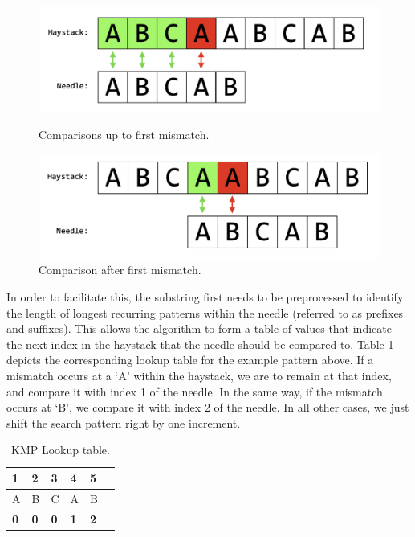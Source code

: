 \begin{figure}[H]
  \centering
  \begin{minipage}[b]{0.49\textwidth}
    \includegraphics[width=\textwidth]{images/kmp_1.png}
    \caption{Comparisons up to first mismatch.}
    \label{fig:kmp_1}
  \end{minipage}
  \hfill
  \begin{minipage}[b]{0.49\textwidth}
    \includegraphics[width=\textwidth]{images/kmp_2.png}
    \caption{Comparison after first mismatch.}
    \label{fig:kmp_2}
  \end{minipage}
\end{figure}

\noindent
In order to facilitate this, the substring first needs to be preprocessed to identify the length of longest recurring patterns within the needle (referred to as prefixes and suffixes). This allows the algorithm to form a table of values that indicate the next index in the haystack that the needle should be compared to. Table \ref{tab:kmp_table} depicts the corresponding lookup table for the example pattern above. If a mismatch occurs at a `A' within the haystack, we are to remain at that index, and compare it with index 1 of the needle. In the same way, if the mismatch occurs at `B', we compare it with index 2 of the needle. In all other cases, we just shift the search pattern right by one increment. 



\begin{table}[H]
    \centering
    \begin{tabular}{llllll}
    1 & 2 & 3 & 4 & 5 \\ \hline
    \multicolumn{1}{|l|}{A} & \multicolumn{1}{l|}{B} & \multicolumn{1}{l|}{C} & \multicolumn{1}{l|}{A} & \multicolumn{1}{l|}{B} \\ \hline
    \multicolumn{1}{|l|}{\textbf{0}} & \multicolumn{1}{l|}{\textbf{0}} & \multicolumn{1}{l|}{\textbf{0}} & \multicolumn{1}{l|}{\textbf{1}} & \multicolumn{1}{l|}{\textbf{2}} \\ \hline
    \end{tabular}
    \caption{KMP Lookup table.}
    \label{tab:kmp_table}
\end{table}

